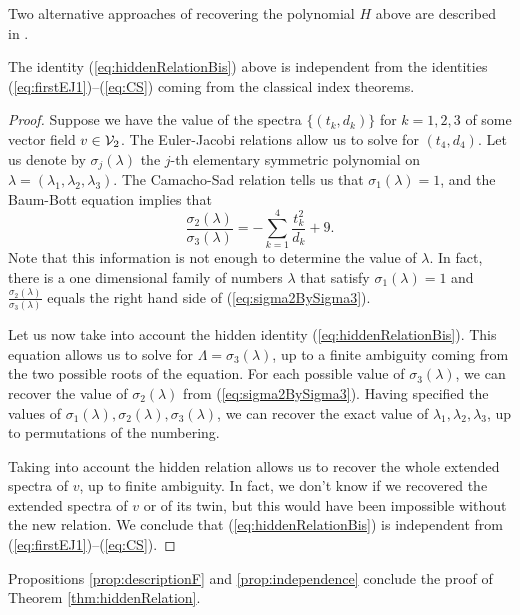 \documentclass[phd,tocprelim]{cornell}
\begin{document}
Two alternative approaches of recovering the polynomial $H$ above are described in \cite{NoIndexTheorems}.

\begin{proposition}\label{prop:independence}
 The identity (\ref{eq:hiddenRelationBis}) above is independent from the identities (\ref{eq:firstEJ1})--(\ref{eq:CS}) coming from the classical index theorems. 
\end{proposition}

\begin{proof}
 Suppose we have the value of the spectra $\{(t_k,d_k)\}$ for $k=1,2,3$ of some vector field $v\in\mathcal{V}_2$. The Euler-Jacobi relations allow us to solve for $(t_4,d_4)$. Let us denote by $\sigma_j(\lambda)$ the $j$-th elementary symmetric polynomial on $\lambda=(\lambda_1,\lambda_2,\lambda_3)$. The Camacho-Sad relation tells us that $\sigma_1(\lambda)=1$, and the Baum-Bott equation implies that
  \begin{equation}\label{eq:sigma2BySigma3}
   \frac{\sigma_2(\lambda)}{\sigma_3(\lambda)} = -\sum_{k=1}^4 \frac{t_k^2}{d_k} + 9 .
  \end{equation}
 Note that this information is not enough to determine the value of $\lambda$. In fact, there is a one dimensional family of numbers $\lambda$ that satisfy $\sigma_1(\lambda)=1$ and $\frac{\sigma_2(\lambda)}{\sigma_3(\lambda)}$ equals the right hand side of (\ref{eq:sigma2BySigma3}).
 
 Let us now take into account the hidden identity (\ref{eq:hiddenRelationBis}). This equation allows us to solve for $\Lambda=\sigma_3(\lambda)$, up to a finite ambiguity coming from the two possible roots of the equation. For each possible value of $\sigma_3(\lambda)$, we can recover the value of $\sigma_2(\lambda)$ from (\ref{eq:sigma2BySigma3}). Having specified the values of $\sigma_1(\lambda),\sigma_2(\lambda),\sigma_3(\lambda)$, we can recover the exact value of $\lambda_1,\lambda_2,\lambda_3$, up to permutations of the numbering. 
 
 Taking into account the hidden relation allows us to recover the whole extended spectra of $v$, up to finite ambiguity. In fact, we don't know if we recovered the extended spectra of $v$ or of its twin, but this would have been impossible without the new relation. We conclude that (\ref{eq:hiddenRelationBis}) is independent from (\ref{eq:firstEJ1})--(\ref{eq:CS}).
\end{proof}

Propositions \ref{prop:descriptionF} and \ref{prop:independence} conclude the proof of Theorem \ref{thm:hiddenRelation}.
\end{document}
